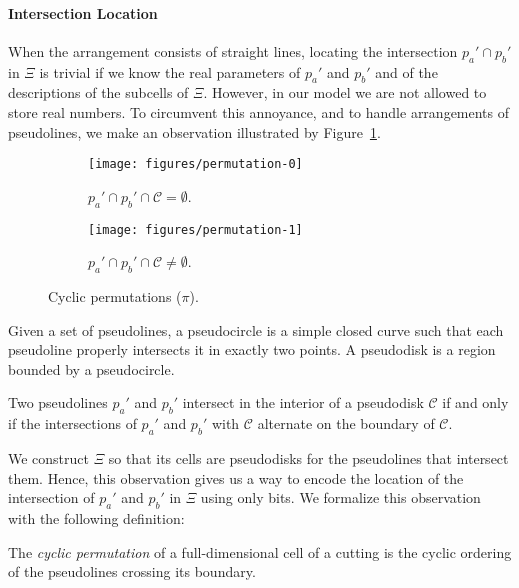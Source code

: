 \paragraph*{Intersection Location}
%
When the arrangement consists of straight lines,
locating the intersection \(p_a' \cap p_b'\) in \(\Xi\) is trivial if we
know the real parameters of \(p_a'\) and \(p_b'\) and of the descriptions
of the subcells of \(\Xi\). However, in our model we are not allowed to store
real numbers. To circumvent this annoyance, and to handle arrangements of
pseudolines, we make an observation illustrated by
Figure~\ref{fig:permutation}.
%
\begin{figure}
\centering{}
\begin{subfigure}[t]{0.5\textwidth}
\centering{}
\texttt{[image: figures/permutation-0]}
\caption{\(p_a' \cap p_b' \cap \mathcal{C} = \emptyset\).}
\end{subfigure}%
\begin{subfigure}[t]{0.5\textwidth}
\centering{}
\texttt{[image: figures/permutation-1]}
\caption{\(p_a' \cap p_b' \cap \mathcal{C} \neq \emptyset\).}
\end{subfigure}
\caption{Cyclic permutations (\(\pi\)).}\label{fig:permutation}
\end{figure}
%
\begin{definition}
    Given a set of pseudolines, a pseudocircle is a simple closed curve such that
    each pseudoline properly intersects it in exactly two points.
    A pseudodisk is a region bounded by a pseudocircle.
\end{definition}
%
\begin{observation}
    Two pseudolines \(p_a'\) and \(p_b'\)
    intersect in the interior of a pseudodisk \(\mathcal{C}\) if and only if
    the intersections of \(p_a'\) and \(p_b'\) with \(\mathcal{C}\)
    alternate on the boundary of \(\mathcal{C}\).
\end{observation}
%
%
We construct \(\Xi\) so that its cells are pseudodisks for the pseudolines that
intersect them.
%
Hence, this observation gives us a way to encode the location of the
intersection of \(p_a'\) and \(p_b'\) in \(\Xi\) using only bits.
%
We formalize this observation with the following definition:
\begin{definition}
  The \emph{cyclic permutation} of a full-dimensional cell of a cutting
  is the cyclic ordering of the pseudolines crossing its boundary.
\end{definition}
